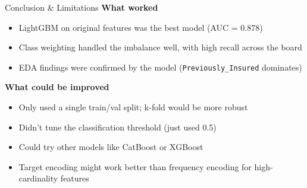 \documentclass[aspectratio=169, 10pt]{beamer}
\begin{document}
\begin{frame}{Conclusion \& Limitations}
  \textbf{What worked}
  \begin{itemize}
    \item LightGBM on original features was the best model (AUC = 0.878)
    \item Class weighting handled the imbalance well, with high recall across the board
    \item EDA findings were confirmed by the model (\texttt{Previously\_Insured} dominates)
  \end{itemize}

  \vspace{0.3cm}
  \textbf{What could be improved}
  \begin{itemize}
    \item Only used a single train/val split; k-fold would be more robust
    \item Didn't tune the classification threshold (just used 0.5)
    \item Could try other models like CatBoost or XGBoost
    \item Target encoding might work better than frequency encoding for high-cardinality features
  \end{itemize}
\end{frame}
\end{document}
